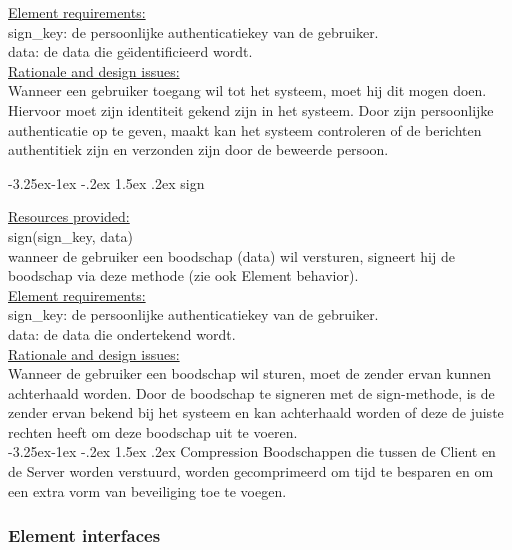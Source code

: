 \documentclass[a4paper,10pt]{article}
\makeatletter
\renewcommand\paragraph{\@startsection{paragraph}{4}{\z@}%
  {-3.25ex\@plus -1ex \@minus -.2ex}%
  {1.5ex \@plus .2ex}%
  {\normalfont\normalsize\bfseries}}
\makeatother
\begin{document}
\underline{Element requirements:}\\
sign\_key: de persoonlijke authenticatiekey van de gebruiker.\\
data: de data die ge\"{\i}dentificieerd wordt.\\

\underline{Rationale and design issues:}\\
Wanneer een gebruiker toegang wil tot het systeem, moet hij dit mogen doen. Hiervoor moet zijn identiteit gekend zijn in het systeem. Door zijn persoonlijke authenticatie op te geven, maakt kan het systeem controleren of de berichten authentitiek zijn en verzonden zijn door de beweerde persoon.

\paragraph{sign}

\underline{Resources provided:}\\
sign(sign\_key, data)\\
wanneer de gebruiker een boodschap (data) wil versturen, signeert hij de boodschap via deze methode (zie ook Element behavior).\\

\underline{Element requirements:}\\
sign\_key: de persoonlijke authenticatiekey van de gebruiker.\\
data: de data die ondertekend wordt.\\

\underline{Rationale and design issues:}\\
Wanneer de gebruiker een boodschap wil sturen, moet de zender ervan kunnen achterhaald worden. Door de boodschap te signeren met de sign-methode, is de zender ervan bekend bij het systeem en kan achterhaald worden of deze de juiste rechten heeft om deze boodschap uit te voeren.\\

\paragraph{Compression}
Boodschappen die tussen de Client en de Server worden verstuurd, worden gecomprimeerd om tijd te besparen en om een extra vorm van beveiliging toe te voegen.

\subsubsection*{Element interfaces}
\end{document}
